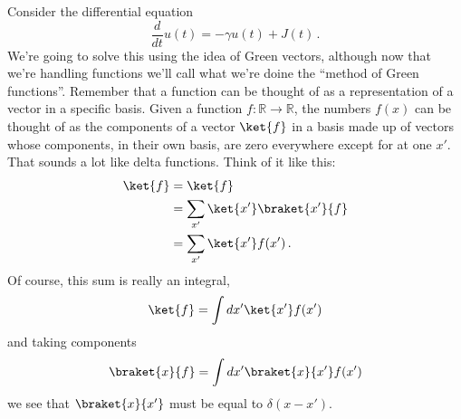 
Consider the differential equation
\begin{equation}
  \frac{d}{dt} u(t) = - \gamma u(t) + J(t)
  \, .
\end{equation}
We're going to solve this using the idea of Green vectors, although now that we're handling functions we'll call what we're doine the ``method of Green functions''.
Remember that a function can be thought of as a representation of a vector in a specific basis.
Given a function $f:\mathbb{R} \rightarrow \mathbb{R}$, the numbers $f(x)$ can be thought of as the components of a vector $\ket{f}$ in a basis made up of vectors whose components, in their own basis, are zero everywhere except for at one $x'$.
That sounds a lot like delta functions.
Think of it like this:
\begin{align*}
  \ket{f} &= \ket{f} \\
  &= \sum_{x'} \ket{x'}\braket{x'}{f} \\
  &= \sum_{x'} \ket{x'} f(x')
  \, .
\end{align*}
Of course, this sum is really an integral,
\begin{equation}
  \ket{f} = \int dx' \ket{x'} f(x')
\end{equation}
and taking components
\begin{equation}
  \braket{x}{f} = \int dx' \braket{x}{x'} f(x')
\end{equation}
we see that $\braket{x}{x'}$ must be equal to $\delta(x - x')$.

